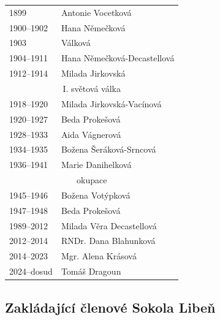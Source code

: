 \documentclass[a5paper, 11pt, twoside]{article}
\begin{document}
\begin{multicols}{2}
\begin{tabular}[]{l >{\raggedright\arraybackslash}p{3cm}}
1899 & Antonie Vocetková \\
1900--1902 & Hana Němečková \\
1903 & Válková \\
1904--1911 & Hana Němečková-Decastellová \\
1912--1914 & Milada Jirkovská \\[6pt]
\multicolumn{2}{c}{I. světová válka} \\[6pt]
1918--1920 & Milada Jirkovská-Vacínová \\
1920--1927 & Beda Prokešová \\
1928--1933 & Aida Vágnerová \\
1934--1935 & Božena Šeráková-Srncová \\
1936--1941 & Marie Danihelková \\[6pt]
\multicolumn{2}{c}{okupace} \\[6pt]
1945--1946 & Božena Votýpková \\
1947--1948 & Beda Prokešová \\
1989--2012 & Milada Věra Decastellová \\
2012--2014 & RNDr. Dana Blahunková \\
2014--2023 & Mgr. Alena Krásová \\
2024--dosud & Tomáš Dragoun \\
\end{tabular}

\end{multicols}

\clearpage
\subsection*{Zakládající členové Sokola Libeň}
\end{document}
